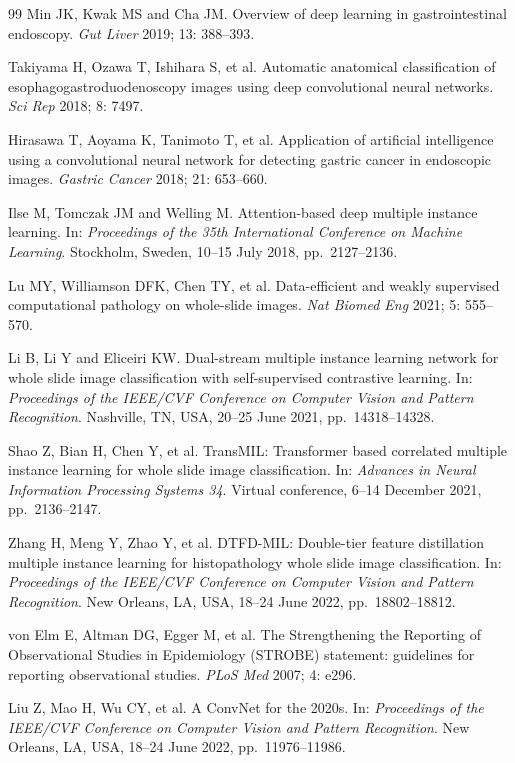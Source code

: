 \documentclass[Afour,sagev,times]{sagej}
\begin{document}
\begin{thebibliography}{99}
Min JK, Kwak MS and Cha JM. Overview of deep learning in gastrointestinal endoscopy. \textit{Gut Liver} 2019; 13: 388--393.

Takiyama H, Ozawa T, Ishihara S, et al. Automatic anatomical classification of esophagogastroduodenoscopy images using deep convolutional neural networks. \textit{Sci Rep} 2018; 8: 7497.

Hirasawa T, Aoyama K, Tanimoto T, et al. Application of artificial intelligence using a convolutional neural network for detecting gastric cancer in endoscopic images. \textit{Gastric Cancer} 2018; 21: 653--660.

Ilse M, Tomczak JM and Welling M. Attention-based deep multiple instance learning. In: \textit{Proceedings of the 35th International Conference on Machine Learning}. Stockholm, Sweden, 10--15 July 2018, pp.~2127--2136.

Lu MY, Williamson DFK, Chen TY, et al. Data-efficient and weakly supervised computational pathology on whole-slide images. \textit{Nat Biomed Eng} 2021; 5: 555--570.

Li B, Li Y and Eliceiri KW. Dual-stream multiple instance learning network for whole slide image classification with self-supervised contrastive learning. In: \textit{Proceedings of the IEEE/CVF Conference on Computer Vision and Pattern Recognition}. Nashville, TN, USA, 20--25 June 2021, pp.~14318--14328.

Shao Z, Bian H, Chen Y, et al. TransMIL: Transformer based correlated multiple instance learning for whole slide image classification. In: \textit{Advances in Neural Information Processing Systems 34}. Virtual conference, 6--14 December 2021, pp.~2136--2147.

Zhang H, Meng Y, Zhao Y, et al. DTFD-MIL: Double-tier feature distillation multiple instance learning for histopathology whole slide image classification. In: \textit{Proceedings of the IEEE/CVF Conference on Computer Vision and Pattern Recognition}. New Orleans, LA, USA, 18--24 June 2022, pp.~18802--18812.

von Elm E, Altman DG, Egger M, et al. The Strengthening the Reporting of Observational Studies in Epidemiology (STROBE) statement: guidelines for reporting observational studies. \textit{PLoS Med} 2007; 4: e296.

Liu Z, Mao H, Wu CY, et al. A ConvNet for the 2020s. In: \textit{Proceedings of the IEEE/CVF Conference on Computer Vision and Pattern Recognition}. New Orleans, LA, USA, 18--24 June 2022, pp.~11976--11986.

\end{thebibliography}
\end{document}
